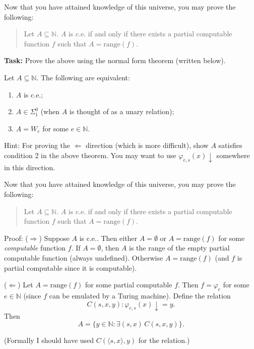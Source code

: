 \documentclass{beamer}
\begin{document}
\begin{frame}{\emojimoyai\emojimoyai\emojimoyai\emojimoyai\emojimoyai\emojimoyai}
Now that you have attained knowledge of this universe, you may prove the following:
\begin{quotation}
Let $A \subseteq \mathbb N$. $A$ is c.e. if and only if there exists a partial computable function $f$ such that $A = \text{range}(f)$.
\end{quotation}

\textbf{Task:} Prove the above using the normal form theorem (written below).

\begin{theorem}
Let $A \subseteq \mathbb N$. The following are equivalent:
\begin{enumerate}
\item $A$ is c.e.;
\item $A \in \Sigma^0_1$ (when $A$ is thought of as a unary relation);
\item $A = W_e$ for some $e \in \mathbb N$.
\end{enumerate}
\end{theorem}


Hint: For proving the $\Leftarrow$ direction (which is more difficult), show $A$ satisfies condition 2 in the above theorem. You may want to use $\varphi_{e, s}(x) \downarrow$ somewhere in this direction.


\end{frame}

\begin{frame}{\emojimoyai\emojimoyai\emojimoyai\emojimoyai\emojimoyai\emojimoyai}
Now that you have attained knowledge of this universe, you may prove the following:
\begin{quotation}
Let $A \subseteq \mathbb N$. $A$ is c.e. if and only if there exists a partial computable function $f$ such that $A = \text{range}(f)$.
\end{quotation}

Proof: ($\Rightarrow$) Suppose $A$ is c.e.. Then either $A = \emptyset$ or $A = \text{range}(f)$ for some \textit{computable} function $f$. If $A = \emptyset$, then $A$ is the range of the empty partial computable function (always undefined). Otherwise $A = \text{range}(f)$ (and $f$ is partial computable since it is computable).

\vspace{2mm}

($\Leftarrow$) Let $A = \text{range}(f)$ for some partial computable $f$. Then $f = \varphi_e$ for some $e \in \mathbb N$ (since $f$ can be emulated by a Turing machine). Define the relation
$$C(s, x, y): \varphi_{e, s}(x) \downarrow = y.$$
Then 
$$A = \{y \in \mathbb N: \exists (s, x)  \, C(s, x, y) \}.$$


(Formally I should have used $C(\langle s, x \rangle, y)$ for the relation.)
\end{frame}
\end{document}
